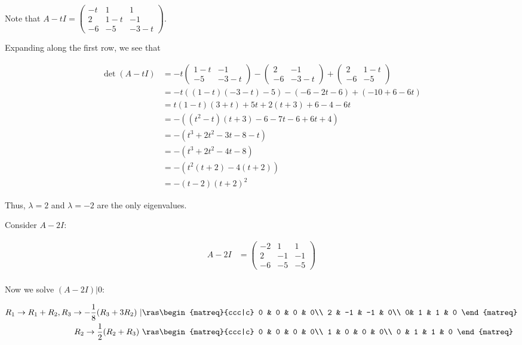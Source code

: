 \documentclass[11pt]{scrartcl}
\begin{document}
\begin{soln}
  \hfill

Note that $A-tI = 
\begin{pmatrix}
-t & 1 & 1\\
2 & 1-t & -1\\
-6 & -5 & -3 - t
\end{pmatrix}
$.

Expanding along the first row, we see that

\begin{align}
\det(A-tI) &= 
-t 
             \begin{pmatrix}
1-t & -1\\
-5 & -3-t
             \end{pmatrix}
-
     \begin{pmatrix}
2 & -1\\
-6 & -3-t
     \end{pmatrix}
+
     \begin{pmatrix}
2 & 1-t\\
-6 & -5
\end{pmatrix}\\
           &= -t \left(   (1-t) (-3-t) - 5\right)-\left( -6-2t-6 \right)+\left( -10+6-6t \right)\\
           &= t(1-t)(3+t)+5t+2(t+3)+ 6 -4 -6t\\
           &= -\left( (t^2-t)(t+3)-6-7t-6+6t+4 \right)\\
           &= - \left( t^3+2t^2-3t-8-t \right)\\
           &= - \left( t^3 + 2t^2 -4t -8\right)\\
           &=-\left(   t^ 2 (t+2) -4 (t+2)\right)\\
           &=-(t-2)(t+2)^2
\end{align}

Thus, $\lambda = 2$ and $\lambda= -2$ are the only eigenvalues.

Consider $A-2I$:

\begin{align}
A-2I  & =
 \begin{pmatrix}
   -2 & 1   & 1  \\
   2  & -1 & -1 \\
   -6 & -5  & -5
 \end{pmatrix}\\
\end{align}

Now we solve $(A-2I)| 0$:

\begin{align}
R_1\to R_1+R_2, R_3\to -\frac{1}{8}(R_{3}+3R_2)\ |      &\ras
        \begin{matreq}{ccc|c}
0 & 0 & 0 & 0\\
2 & -1 & -1 & 0\\
0& 1 & 1 & 0
        \end{matreq}\\
R_2\to \frac{1}{2}(R_2+R_3) \ &\ras
        \begin{matreq}{ccc|c}
0 & 0 & 0 & 0\\
1 & 0 & 0 & 0\\
0 & 1 & 1 & 0
        \end{matreq}
\end{align}


\end{soln}
\end{document}
